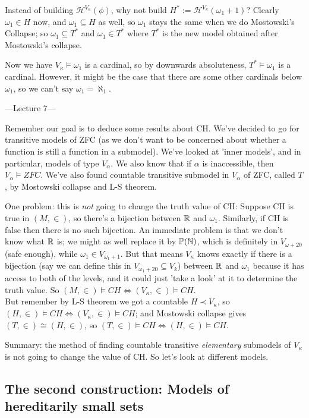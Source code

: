 \documentclass[a4paper]{article}
\begin{document}
Instead of building $\mathcal{H}^{V_\kappa}(\phi)$, why not build $H^* := \mathcal{H}^{V_\kappa} (\omega_1+1)$? Clearly $\omega_1 \in H$ now, and $\omega_1 \subseteq H$ as well, so $\omega_1$ stays the same when we do Mostowski's Collapse; so $\omega_1 \subseteq T^*$ and $\omega_1 \in T^*$ where $T^*$ is the new model obtained after Mostowski's collapse.

Now we have $V_\kappa \vDash \omega_1$ is a cardinal, so by downwards absoluteness, $T^* \vDash \omega_1$ is a cardinal. However, it might be the case that there are some other cardinals below $\omega_1$, so we can't say $\omega_1 = \aleph_1$.

---Lecture 7---

Remember our goal is to deduce some results about CH. We've decided to go for transitive models of ZFC (as we don't want to be concerned about whether a function is still a function in a submodel). We've looked at 'inner models', and in particular, models of type $V_\alpha$. We also know that if $\alpha$ is inaccessible, then $V_\alpha \vDash ZFC$. We've also found countable transitive submodel in $V_\alpha$ of ZFC, called $T$, by Mostowski collapse and L-S theorem.

One problem: this is \emph{not} going to change the truth value of CH: Suppose CH is true in $(M,\in)$, so there's a bijection between $\mathbb{R}$ and $\omega_1$. Similarly, if CH is false then there is no such bijection. An immediate problem is that we don't know what $\mathbb{R}$ is; we might as well replace it by $\mathbb{P}(\mathbb{N})$, which is definitely in $V_{\omega+20}$ (safe enough), while $\omega_1 \in V_{\omega_1+1}$. But that means $V_\kappa$ knows exactly if there is a bijection (say we can define this in $V_{\omega_1+20} \subseteq V_k$) between $\mathbb{R}$ and $\omega_1$ because it has access to both of the levels, and it could just 'take a look' at it to determine the truth value. So $(M,\in) \vDash CH \iff (V_\kappa,\in) \vDash CH$.\\
But remember by L-S theorem we got a countable $H \prec V_\kappa$, so $(H,\in) \vDash CH \iff (V_\kappa,\in) \vDash CH$; and Mostowski collapse gives $(T,\in) \cong (H,\in)$, so $(T,\in) \vDash CH \iff (H,\in) \vDash CH$.

Summary: the method of finding countable transitive \emph{elementary} submodels of $V_\kappa$ is not going to change the value of CH. So let's look at different models.

\subsection{The second construction: Models of hereditarily small sets}
\end{document}
